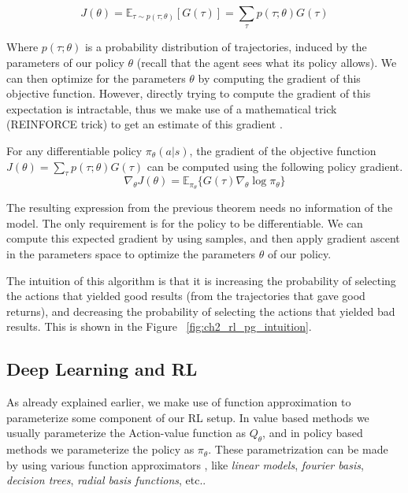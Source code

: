 \begin{equation}
    J(\theta) = \mathbb{E}_{\tau \sim p(\tau;\theta)}[G(\tau)] = \sum_{\tau} p(\tau;\theta) G(\tau)
\end{equation}

Where $p(\tau;\theta)$ is a probability distribution of trajectories, induced by
the parameters of our policy $\theta$ (recall that the agent sees what its policy allows).
We can then optimize for the parameters $\theta$ by computing the gradient of this
objective function. However, directly trying to compute the gradient of this expectation
is intractable, thus we make use of a mathematical trick (REINFORCE trick) to get an estimate of this gradient \citep{PGSutton}. 

\begin{theorem}
    For any differentiable policy $\pi_{\theta}(a|s)$, the gradient of the
    objective function $J(\theta) = \sum_{\tau} p(\tau;\theta) G(\tau)$ 
    can be computed using the following policy gradient.
    \begin{equation}
        \nabla_{\theta} J(\theta) = \mathbb{E}_{\pi_{\theta}} \lbrace G(\tau) \nabla_{\theta} \log \pi_{\theta} \rbrace
    \end{equation}
\end{theorem}

The resulting expression from the previous theorem needs no information of the model.
The only requirement is for the policy to be differentiable. We can compute this expected
gradient by using samples, and then apply gradient ascent in the parameters space to optimize 
the parameters $\theta$ of our policy.

The intuition of this algorithm is that it is increasing the probability of selecting
the actions that yielded good results (from the trajectories that gave good returns), 
and decreasing the probability of selecting the actions that yielded bad results. This
is shown in the Figure ~\ref{fig:ch2_rl_pg_intuition}.

\figRlPolicyGradientsIntuition

\subsection{Deep Learning and RL}
As already explained earlier, we make use of function approximation to parameterize
some component of our RL setup. In value based methods we usually parameterize the
Action-value function as $Q_{\theta}$, and in policy based methods we parameterize
the policy as $\pi_{\theta}$. These parametrization can be made by using various
function approximators , like \textit{linear models}, \textit{fourier basis}, 
\textit{decision trees}, \textit{radial basis functions}, etc..

